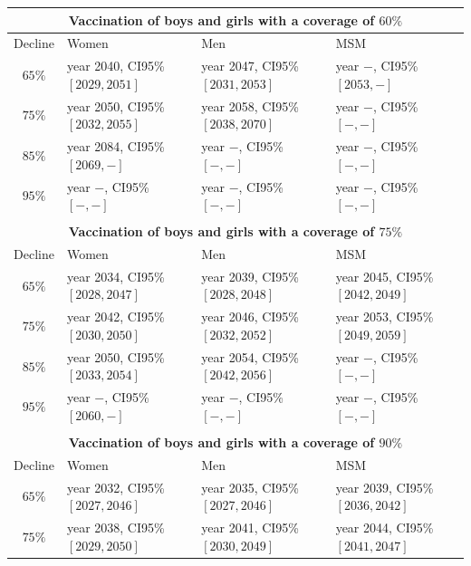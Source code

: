 \begin{table}[!h]
	\hspace*{-6em}%
	\centering
	\small
	\begin{tabular}{c|lll}
        \\
        \hline
        \multicolumn{4}{c}{\textbf{Vaccination of boys and girls with a coverage of $60\%$}}\\
        \hline
        Decline & Women &  Men & MSM \\ 
        \hline		
$ 65 \%$ & year 2040, CI95\% $[ 2029 , 2051 ]$ & year  2047, CI95\% $[ 2031 , 2053 ]$ & year $-$, CI95\% $[ 2053, - ]$ \\
$ 75 \%$ & year 2050, CI95\% $[ 2032 , 2055 ]$ & year  2058, CI95\% $[ 2038, 2070 ]$ & year  $-$, CI95\% $[ - , - ]$ \\
$ 85 \%$ & year 2084, CI95\% $[ 2069, - ]$ & year  $-$, CI95\% $[ - , - ]$ & year  $-$, CI95\% $[ - , - ]$ \\
$ 95 \%$ & year $-$, CI95\% $[ - , - ]$ & year  $-$, CI95\% $[ - , - ]$ & year  $-$, CI95\% $[ - , - ]$ \\
		\\
		\hline 		
		\multicolumn{4}{c}{\textbf{Vaccination of boys and girls with a coverage of $75\%$}}\\
		\hline
		Decline & Women &  Men & MSM \\ 
		\hline 
$ 65 \%$ & year 2034, CI95\% $[ 2028 , 2047 ]$ & year 2039, CI95\% $[ 2028 , 2048 ]$ & year 2045, CI95\% $[ 2042 , 2049 ]$ \\
$ 75 \%$ & year 2042, CI95\% $[ 2030 , 2050 ]$ & year 2046, CI95\% $[ 2032 , 2052 ]$ & year 2053, CI95\% $[ 2049 , 2059 ]$ \\
$ 85 \%$ & year 2050, CI95\% $[ 2033 , 2054 ]$ & year 2054, CI95\% $[ 2042 , 2056 ]$ & year $-$, CI95\% $[ - , - ]$ \\
$ 95 \%$ & year $-$, CI95\% $[ 2060 , - ]$ & year $-$, CI95\% $[ - , - ]$ & year $-$, CI95\% $[ - , - ]$ \\
         \\
         \hline
         \multicolumn{4}{c}{\textbf{Vaccination of boys and girls with a coverage of $90\%$}}\\
         \hline
         Decline & Women &  Men & MSM \\ 
         \hline
$ 65 \%$ & year 2032, CI95\% $[ 2027 , 2046 ]$ & year 2035, CI95\% $[ 2027 , 2046 ]$ & year 2039, CI95\% $[ 2036 , 2042 ]$ \\
$ 75 \%$ & year 2038, CI95\% $[ 2029 , 2050 ]$ & year 2041, CI95\% $[ 2030 , 2049 ]$ & year 2044, CI95\% $[ 2041 , 2047 ]$ \\

\end{tabular}
\end{table}
